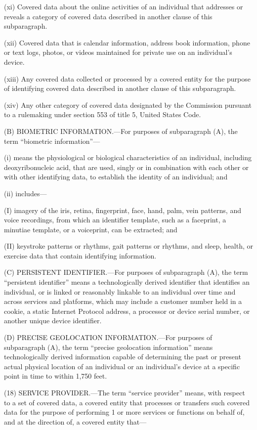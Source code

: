 (xi) Covered data about the online activities of an individual that addresses or reveals a category of covered data described in another clause of this subparagraph.

(xii) Covered data that is calendar information, address book information, phone or text logs, photos, or videos maintained for private use on an individual’s device.

(xiii) Any covered data collected or processed by a covered entity for the purpose of identifying covered data described in another clause of this subparagraph.

(xiv) Any other category of covered data designated by the Commission pursuant to a rulemaking under section 553 of title 5, United States Code.

(B) BIOMETRIC INFORMATION.—For purposes of subparagraph (A), the term “biometric information”—

(i) means the physiological or biological characteristics of an individual, including deoxyribonucleic acid, that are used, singly or in combination with each other or with other identifying data, to establish the identity of an individual; and

(ii) includes—

(I) imagery of the iris, retina, fingerprint, face, hand, palm, vein patterns, and voice recordings, from which an identifier template, such as a faceprint, a minutiae template, or a voiceprint, can be extracted; and

(II) keystroke patterns or rhythms, gait patterns or rhythms, and sleep, health, or exercise data that contain identifying information.

(C) PERSISTENT IDENTIFIER.—For purposes of subparagraph (A), the term “persistent identifier” means a technologically derived identifier that identifies an individual, or is linked or reasonably linkable to an individual over time and across services and platforms, which may include a customer number held in a cookie, a static Internet Protocol address, a processor or device serial number, or another unique device identifier.

(D) PRECISE GEOLOCATION INFORMATION.—For purposes of subparagraph (A), the term “precise geolocation information” means technologically derived information capable of determining the past or present actual physical location of an individual or an individual’s device at a specific point in time to within 1,750 feet.

(18) SERVICE PROVIDER.—The term “service provider” means, with respect to a set of covered data, a covered entity that processes or transfers such covered data for the purpose of performing 1 or more services or functions on behalf of, and at the direction of, a covered entity that—

